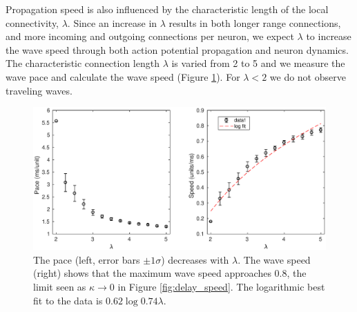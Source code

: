 Propagation speed is also influenced by the characteristic length of the local connectivity, $\lambda$.
Since an increase in $\lambda$ results in both longer range connections, and more incoming and outgoing connections per neuron, we expect $\lambda$ to increase the wave speed through both action potential propagation and neuron dynamics.
The characteristic connection length $\lambda$ is varied from 2 to 5 and we measure the wave pace and calculate the wave speed (Figure \ref{fig:delay_lambda}).
For $\lambda<2$  we do not observe traveling waves.
\begin{figure}[!htb]
 \centering
   \includegraphics[width=\textwidth]{fig/WaveSpeed_Lambda}
   \caption{ The pace (left, error bars $\pm 1 \sigma$) decreases with $\lambda$. 
           The wave speed (right) shows that the maximum wave speed approaches $0.8$, the limit seen as $\kappa \rightarrow 0$ in Figure \ref{fig:delay_speed}. 
           The logarithmic best fit to the data is $0.62\log{0.74\lambda}$.}
   \label{fig:delay_lambda}
\end{figure}

\FloatBarrier

